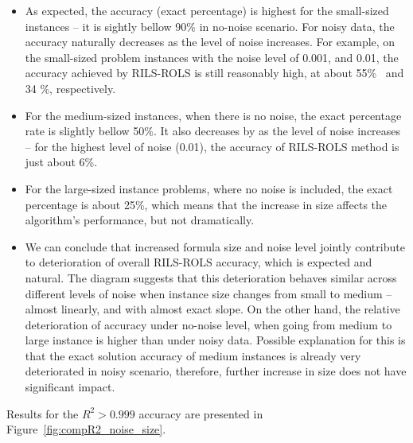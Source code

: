 \documentclass{bmcart}
\begin{document}
\begin{itemize}
	\item   As expected, the accuracy (exact percentage) is highest for the small-sized instances -- it is sightly bellow 90\% in no-noise scenario. For noisy data, the accuracy naturally decreases as the level of noise increases. For example, on the small-sized problem instances with the noise level of 0.001, and 0.01, the accuracy achieved by \textsc{RILS}-\textsc{ROLS} is still reasonably high, at about 55\%~ and 34 \%, respectively. 
	\item For the medium-sized instances, when there is no noise, the exact percentage rate is slightly bellow 50\%. It also decreases by as the level of noise increases -- for the highest level of noise (0.01), the accuracy of \textsc{RILS}-\textsc{ROLS} method is just about 6\%. 
	\item For the large-sized instance problems, where no noise is included, the exact percentage is about 25\%, which means that the increase in size affects the algorithm's performance, but not dramatically.  
	
	\item We can conclude that increased formula size and noise level jointly contribute to deterioration of overall \textsc{RILS-ROLS} accuracy, which is expected and natural. The diagram suggests that this deterioration behaves similar across different levels of noise when instance size changes from small to medium -- almost linearly, and with almost exact slope. On the other hand, the relative deterioration of accuracy under no-noise level, when going from medium to large instance is higher than under noisy data. Possible explanation for this is that the exact solution accuracy of medium instances is already very deteriorated in noisy scenario, therefore, further increase in size does not have significant impact. 
\end{itemize}
	
Results for the $R^2 > 0.999$ accuracy are presented in Figure~\ref{fig:compR2_noise_size}. 

\begin{center}
	\label{fig:compR2_noise_size}
\end{center}
\end{document}

